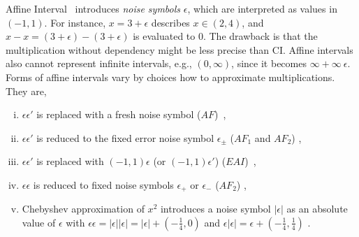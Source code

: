 \documentclass[runningheads,a4paper,oribibl]{llncs}
\newcommand{\suppress}[1]{} %
\begin{document}
Affine Interval~\cite{af,comba93} introduces \emph{noise symbols} $\epsilon$, 
which are interpreted as values in $(-1,1)$. 
For instance, $x = 3 + \epsilon$ describes $x \in (2,4)$, and 
$x - x = (3 + \epsilon) - (3 + \epsilon)$ is evaluated to $0$. 
The drawback is that the multiplication without dependency might be less precise than CI.
Affine intervals also cannot represent infinite intervals, e.g., $(0,\infty)$, 
since it becomes $\infty + \infty~\epsilon$. 
Forms of affine intervals vary by choices how to approximate multiplications. They are,
\begin{enumerate}[(i)]
\item $\epsilon \epsilon'$ is replaced with a fresh noise symbol 
($AF$)~\cite{StolfiThesis,comba93}, 
\item $\epsilon \epsilon'$ is reduced to the fixed error noise symbol 
$\epsilon_{\pm}$ ($AF_1$ and $AF_2$) \cite{af},
\item $\epsilon \epsilon'$ is replaced with $(-1,1) \epsilon$ 
(or $(-1,1) \epsilon'$) ($EAI$)~\cite{ngocsefm},
\item $\epsilon \epsilon$ is reduced to fixed noise symbols 
$\epsilon_+$ or $\epsilon_{-}$ ($AF_2$) \cite{af}, 
\item Chebyshev approximation of $x^2$ introduces a noise symbol $|\epsilon|$ 
as an absolute value of $\epsilon$ with 
$\epsilon \epsilon = |\epsilon| |\epsilon| = |\epsilon| + (-\frac{1}{4}, 0)$ and
$\epsilon |\epsilon| = \epsilon + (-\frac{1}{4}, \frac{1}{4})$ \cite{tapas12}. 
\end{enumerate} 

\suppress{
\begin{remark}
For Affine intervals, \emph{sensitivity}~\cite{ngocsefm} of a variable
is a possible range of the absolute value of the coefficient of its corresponding $\epsilon$. 


Note that Affine interval works only for bounded intervals. 
For instance, $\infty + \infty \epsilon$ represents $(-\infty,\infty)$, which says nothing. 
Narrowing intervals as an incremental search (Section~\ref{sec:incsearch}) partilly depends on this fact. 
That is, if $\pm \infty$ is contained in an interval, first give finite upper/lower bounds and search 
within these bounds using an Affine interval. If UNSAT is concluded, then enlarge to the whole intervals 
using CI. 
\end{remark}
}
\end{document}
